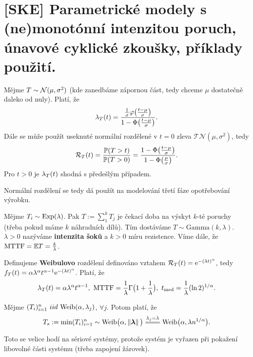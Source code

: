 \chapter{[SKE] Parametrické modely s (ne)monotónní intenzitou poruch, únavové cyklické zkoušky, příklady použití.}

\begin{define}
	Mějme $T\sim \mathcal{N}(\mu, \sigma^2)$ (kde zanedbáme zápornou část, tedy chceme $\mu$ dostatečně daleko od nuly). Platí, že 
	$$ \lambda_T(t)=\frac{\frac{1}{\sigma}\varphi\big(\frac{t-\mu}{\sigma}\big)}{1-\Phi\big(\frac{t-\mu}{\sigma}\big)}.$$
		Dále se může použít useknuté normální rozdělené v $t=0$ zleva $\mathcal{TN}(\mu,\sigma^2)$, tedy $$\mathcal{R}_T(t)=\frac{\mathbb{P}(T>t)}{\mathbb{P}(T>0)}=\frac{1-\Phi\big(\frac{t-\mu}{\sigma}\big)}{1-\Phi\big(\frac{\mu}{\sigma}\big)}.$$ Pro $t>0$ je $\lambda_T(t)$ shodná s předešlým případem.
\end{define}

Normální rozdělení se tedy dá použít na modelování třetí fáze opotřebování výrobku.

\begin{define}
Mějme $T_i\sim \mathrm{Exp}(\lambda)$. Pak $T:=\sum_{1}^{k}T_j$ je čekací doba na výskyt $k$-té poruchy (třeba pokud máme $k$ náhradních dílů). Tím dostáváme $T\sim\mathrm{Gamma}(k,\lambda)$. $\lambda>0$ nazýváme \textbf{intenzita šoků} a $k>0$ míru rezistence. Víme dále, že $\mathrm{MTTF}=\mathbb{E} T=\frac{k}{\lambda}$. 
\end{define}

\begin{define}
	Definujeme \textbf{Weibulovo} rozdělení definováno vztahem $\mathcal{R}_T(t)=\mathrm{e}^{-(\lambda t)^\alpha}$, tedy $f_T(t)=\alpha \lambda^\alpha t^{\alpha-1}\mathrm{e}^{-(\lambda t)^\alpha}$. Platí, že
	$$ \lambda_T(t)=\alpha\lambda^\alpha t^{\alpha-1},~\mathrm{MTTF}=\frac{1}{\lambda}\Gamma\big(1+\frac{1}{\lambda}\big),~t_\mathrm{med}=\frac{1}{\lambda}(\ln2)^{1/\alpha}.$$
\end{define}

\begin{theorem}
	Mějme $(T_i)_{i=1}^n~iid~\mathrm{Weib}(\alpha,\lambda_j)$, $\forall j$. Potom platí, že 
	$$ T_s:=\min(T_i)_{i=1}^n \sim \Weib\big(\alpha,\left\|\boldsymbol{\lambda}\right\|\big)\equal{\lambda_j=\lambda}\Weib\big(\alpha,\lambda n^{1/\alpha}\big).$$
\end{theorem}

Toto se velice hodí na sériové systémy, protože systém je vyřazen při pokažení libovolné části systému (třeba zapojení žárovek).

